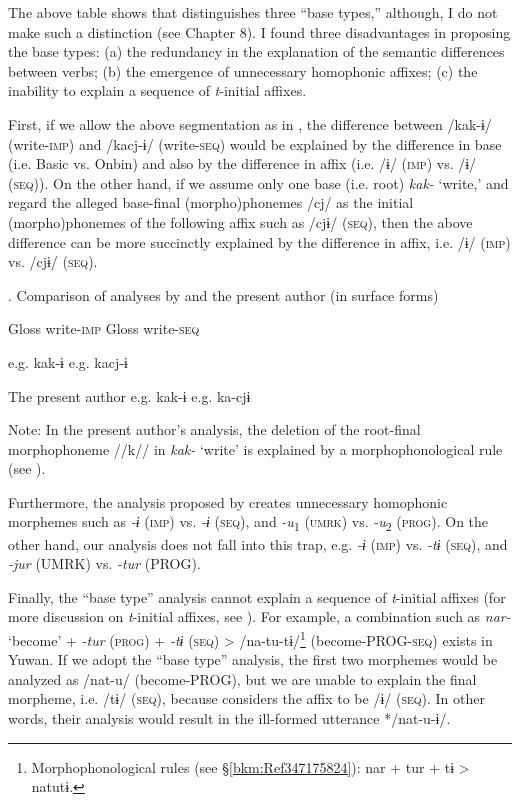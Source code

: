 The above table shows that \citet{UchimaEtAl1976} distinguishes three “base types,” although, I do not make such a distinction (see Chapter 8). I found three disadvantages in proposing the base types: (a) the redundancy in the explanation of the semantic differences between verbs; (b) the emergence of unnecessary homophonic affixes; (c) the inability to explain a sequence of \textit{t}-initial affixes.

First, if we allow the above segmentation as in , the difference between /kak-ɨ/ (write-\textsc{imp}) and /kacj-ɨ/ (write-\textsc{seq}) would be explained by the difference in base (i.e. Basic vs. Onbin) and also by the difference in affix (i.e. /ɨ/ (\textsc{imp}) vs. /ɨ/ (\textsc{seq})). On the other hand, if we assume only one base (i.e. root) \textit{kak-} ‘write,’ and regard the alleged base-final (morpho)phonemes /cj/ as the initial (morpho)phonemes of the following affix such as /cjɨ/ (\textsc{seq}), then the above difference can be more succinctly explained by the difference in affix, i.e. /ɨ/ (\textsc{imp}) vs. /cjɨ/ (\textsc{seq}).

\begin{table}
\caption{\label{tab:key:69}. Comparison of analyses by \citet{UchimaEtAl1976} and the present author (in surface forms)}

  Gloss  write-\textsc{imp}    Gloss  write-\textsc{seq}

\citet{UchimaEtAl1976}  e.g.  kak-ɨ    e.g.  kacj-ɨ

The present author  e.g.  kak-ɨ    e.g.  ka-cjɨ

Note: In the present author’s analysis, the deletion of the root-final morphophoneme //k// in \textit{kak-} ‘write’ is explained by a morphophonological rule (see ).
\end{table}

  Furthermore, the analysis proposed by \citet{UchimaEtAl1976} creates unnecessary homophonic morphemes such as \textit{-ɨ} (\textsc{imp}) vs. \textit{-ɨ} (\textsc{seq}), and \textit{-u}\textsubscript{1} (\textsc{umrk}) vs. \textit{-u}\textsubscript{2} (\textsc{prog}). On the other hand, our analysis does not fall into this trap, e.g. \textit{-ɨ} (\textsc{imp}) vs. \textit{-tɨ} (\textsc{seq}), and \textit{-jur} (UMRK) vs. \textit{-tur} (PROG).

  Finally, the “base type” analysis cannot explain a sequence of \textit{t}-initial affixes (for more discussion on \textit{t}-initial affixes, see ). For example, a combination such as \textit{nar-} ‘become’ + \textit{-tur} (\textsc{prog}) + \textit{-tɨ} (\textsc{seq}) > /na-tu-tɨ/\footnote{Morphophonological rules (see §\ref{bkm:Ref347175824}): nar + tur + tɨ > natutɨ.} (become-PROG-\textsc{seq}) exists in Yuwan. If we adopt the “base type” analysis, the first two morphemes would be analyzed as /nat-u/ (become-PROG), but we are unable to explain the final morpheme, i.e. /tɨ/ (\textsc{seq}), because \citet[91-92]{UchimaEtAl1976} considers the affix to be /ɨ/ (\textsc{seq}). In other words, their analysis would result in the ill-formed utterance */nat-u-ɨ/.

